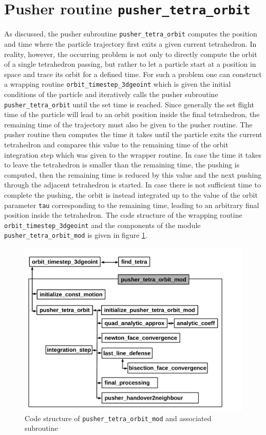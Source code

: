\documentclass[./main.tex]{subfiles}
\begin{document}
\section{Pusher routine \texttt{pusher\_tetra\_orbit}}
\label{sec:NumericalPusher}
As discussed, the pusher subroutine \texttt{pusher\_tetra\_orbit} computes the position and time where the particle trajectory first exits a given current tetrahedron. In reality, however, the occurring problem is not only to directly compute the orbit of a single tetrahedron passing, but rather to let a particle start at a position in space and trace its orbit for a defined time. For such a problem one can construct a wrapping routine \texttt{orbit\_timestep\_3dgeoint} which is given the initial conditions of the particle and iteratively calls the pusher subroutine \texttt{pusher\_tetra\_orbit} until the set time is reached. Since generally the set flight time of the particle will lead to an orbit position inside the final tetrahedron, the remaining time of the trajectory must also be given to the pusher routine. The pusher routine then computes the time it takes until the particle exits the current tetrahedron and compares this value to the remaining time of the orbit integration step which was given to the wrapper routine. In case the time it takes to leave the tetrahedron is smaller than the remaining time, the pushing is computed, then the remaining time is reduced by this value and the next pushing through the adjacent tetrahedron is started. In case there is not sufficient time to complete the pushing, the orbit is instead integrated up to the value of the orbit parameter \texttt{tau} corresponding to the remaining time, leading to an arbitrary final position inside the tetrahedron. The code structure of the wrapping routine \texttt{orbit\_timestep\_3dgeoint} and the components of the module \texttt{pusher\_tetra\_orbit\_mod} is given in figure \ref{fig:Codestructure_Pusher_tetra_orbit}. 

\begin{figure}[h!]
	\includegraphics[width=1\textwidth]{figures/pusher_tetra_orbit.pdf}
	\caption{Code structure of \texttt{pusher\_tetra\_orbit\_mod} and associated subroutine}
	\label{fig:Codestructure_Pusher_tetra_orbit}
\end{figure}
\end{document}
